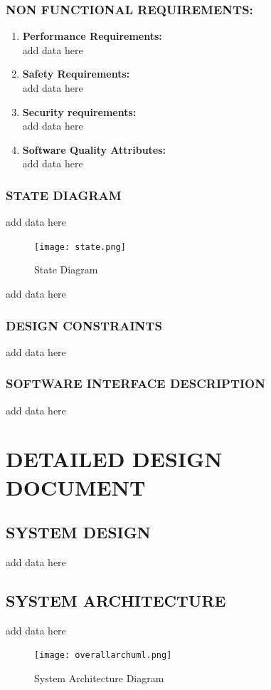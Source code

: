 \documentclass[12pt,a4paper]{report}
\begin{document}
\subsection{NON FUNCTIONAL REQUIREMENTS:}
\begin{enumerate}
\item {\textbf{Performance Requirements:}\\add data here }
\item {\textbf{Safety Requirements:}\\add data here}
\item {\textbf{Security requirements:}\\add data here}
\item {\textbf{Software Quality Attributes:}\\add data here}
\end{enumerate}
\subsection{STATE DIAGRAM}
add data here
\begin{figure}[H]
\begin{center}
\texttt{[image: state.png]}
\end{center}
\caption{State Diagram}
\label{tab:state}
\end{figure}
add data here

\subsection{DESIGN CONSTRAINTS}
add data here
\subsection{SOFTWARE INTERFACE DESCRIPTION}
add data here

\chapter{DETAILED DESIGN DOCUMENT}
\section{SYSTEM DESIGN}
add data here 
\section{SYSTEM ARCHITECTURE}
add data here
\begin{figure}[H]
\begin{center}
\texttt{[image: overallarchuml.png]}
\end{center}
\caption{System Architecture Diagram}
\label{tab:sysarch}
\end{figure}
\end{document}
